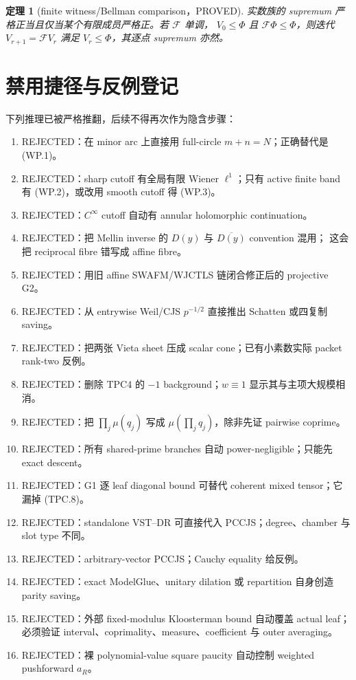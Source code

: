\documentclass[11pt,a4paper]{ctexart}
\newtheorem{theorem}{定理}[section]
\theoremstyle{definition}
\newcommand{\1}{\mathbf 1}
\newcommand{\PROVED}{\textcolor{green!40!black}{\textsf{PROVED}}}
\newcommand{\REJECTED}{\textcolor{purple!70!black}{\textsf{REJECTED}}}
\begin{document}
\begin{theorem}[finite witness/Bellman comparison，\PROVED]
实数族的 supremum 严格正当且仅当某个有限成员严格正。若 $\mathcal F$ 单调，
$V_0\le\Phi$ 且 $\mathcal F\Phi\le\Phi$，则迭代
$V_{r+1}=\mathcal FV_r$ 满足 $V_r\le\Phi$，其逐点 supremum 亦然。
\end{theorem}

\section{禁用捷径与反例登记}
\label{sec:forbidden}

下列推理已被严格推翻，后续不得再次作为隐含步骤：
\begin{enumerate}
\item \REJECTED：在 minor arc 上直接用 full-circle $m+n=N$；正确替代是 (WP.1)。
\item \REJECTED：sharp cutoff 有全局有限 Wiener $\ell^1$；只有 active finite band
      有 (WP.2)，或改用 smooth cutoff 得 (WP.3)。
\item \REJECTED：$C^\infty$ cutoff 自动有 annular holomorphic continuation。
\item \REJECTED：把 Mellin inverse 的 $D(y)$ 与 $\overline{D(y)}$ convention 混用；
      这会把 reciprocal fibre 错写成 affine fibre。
\item \REJECTED：用旧 affine SWAFM/WJCTLS 链闭合修正后的 projective G2。
\item \REJECTED：从 entrywise Weil/CJS $p^{-1/2}$ 直接推出 Schatten 或四复制 saving。
\item \REJECTED：把两张 Vieta sheet 压成 scalar cone；已有小素数实际 packet rank-two 反例。
\item \REJECTED：删除 TPC4 的 $-1$ background；$w\equiv1$ 显示其与主项大规模相消。
\item \REJECTED：把 $\prod_j\mu(q_j)$ 写成 $\mu(\prod_jq_j)$，除非先证 pairwise coprime。
\item \REJECTED：所有 shared-prime branches 自动 power-negligible；只能先 exact descent。
\item \REJECTED：G1 逐 leaf diagonal bound 可替代 coherent mixed tensor；它漏掉 (TPC.8)。
\item \REJECTED：standalone VST--DR 可直接代入 PCCJS；degree、chamber 与 slot type 不同。
\item \REJECTED：arbitrary-vector PCCJS；Cauchy equality 给反例。
\item \REJECTED：exact ModelGlue、unitary dilation 或 repartition 自身创造 parity saving。
\item \REJECTED：外部 fixed-modulus Kloosterman bound 自动覆盖 actual leaf；必须验证
      interval、coprimality、measure、coefficient 与 outer averaging。
\item \REJECTED：裸 polynomial-value square paucity 自动控制 weighted pushforward $a_R$。
\end{enumerate}
\end{document}
